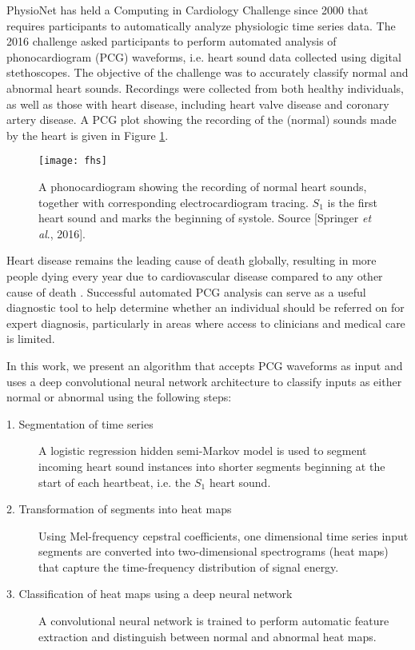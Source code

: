 \documentclass{article}
\begin{document}
PhysioNet \cite{PhysioNet} has held a Computing in Cardiology Challenge since 2000 that requires participants to automatically analyze physiologic time series data. The 2016 challenge \cite{clifford2016classification} asked participants to perform automated analysis of phonocardiogram (PCG) waveforms, i.e. heart sound data collected using digital stethoscopes. The objective of the challenge was to accurately classify normal and abnormal heart sounds. Recordings were collected from both healthy individuals, as well as those with heart disease, including heart valve disease and coronary artery disease. A PCG plot showing the recording of the (normal) sounds made by the heart is given in Figure \ref{fig:fhs}.

\begin{figure}[h]
\texttt{[image: fhs]}
\caption{A phonocardiogram showing the recording of normal heart sounds, together with corresponding electrocardiogram tracing. $S_1$ is the first heart sound and marks the beginning of systole. Source [Springer \emph{et al}., 2016].}
\label{fig:fhs}
\end{figure}

Heart disease remains the leading cause of death globally, resulting in more people dying every year due to  cardiovascular disease compared to any other cause of death \cite{web/who/cvd}. Successful automated PCG analysis can serve as a useful diagnostic tool to help determine whether an individual should be referred on for expert diagnosis, particularly in areas where access to clinicians and medical care is limited. 


In this work, we present an algorithm that accepts PCG waveforms as input and uses a deep convolutional neural network architecture to classify inputs as either normal or abnormal using the following steps:

\begin{description}
\item[1. Segmentation of time series] A logistic regression hidden semi-Markov model is used to segment incoming heart sound instances into shorter segments beginning at the start of each heartbeat, i.e. the $S_1$ heart sound.
\item[2. Transformation of segments into heat maps] Using Mel-frequency cepstral coefficients, one dimensional time series input segments are converted into two-dimensional spectrograms (heat maps) that capture the time-frequency distribution of signal energy.
\item[3. Classification of heat maps using a deep neural network] A convolutional neural network is trained to perform automatic feature extraction and distinguish between normal and abnormal heat maps.
\end{description}
\end{document}
